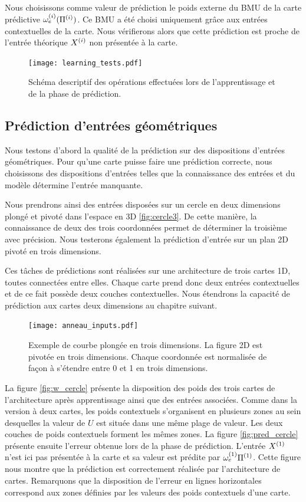 \documentclass[../main]{subfiles}
\begin{document}
Nous choisissons comme valeur de prédiction le poids externe du BMU de la carte prédictive $\omega_{e}^{({i})}(\Pi^{({i})})$. Ce BMU a été choisi uniquement grâce aux entrées contextuelles de la carte. Nous vérifierons alors que cette prédiction est proche de l'entrée théorique $X^{({i})}$ non présentée à la carte.

\begin{figure}
	\texttt{[image: learning\_tests.pdf]}
	\caption{Schéma descriptif des opérations effectuées lors de l'apprentissage et de la phase de prédiction.\label{fig:schema_pred}}
\end{figure}

\subsection{Prédiction d'entrées géométriques}

Nous testons d'abord la qualité de la prédiction sur des dispositions d'entrées géométriques.
Pour qu'une carte puisse faire une prédiction correcte, nous choisissons des dispositions d'entrées telles que la connaissance des entrées et du modèle détermine l'entrée manquante.

Nous prendrons ainsi des entrées disposées sur un cercle en deux dimensions plongé et pivoté dans l'espace en 3D \ref{fig:cercle3}. De cette manière, la connaissance de deux des trois coordonnées permet de déterminer la troisième avec précision. Nous testerons également la prédiction d'entrée sur un plan 2D pivoté en trois dimensions.

Ces tâches de prédictions sont réalisées sur une architecture de trois cartes 1D, toutes connectées entre elles. Chaque carte prend donc deux entrées contextuelles et de ce fait possède deux couches contextuelles.
Nous étendrons la capacité de prédiction aux cartes deux dimensions au chapitre suivant.

\begin{figure}
	\centering\texttt{[image: anneau\_inputs.pdf]}
	\caption{Exemple de courbe plongée en trois dimensions. La figure 2D est pivotée en trois dimensions. Chaque coordonnée est normalisée de façon à s'étendre entre 0 et 1 en trois dimensions.
	\label{fig:in_3D}}
\end{figure}

La figure \ref{fig:w_cercle} présente la disposition des poids des trois cartes de l'architecture après apprentissage ainsi que des entrées associées. 
Comme dans la version à deux cartes, les poids contextuels s'organisent en plusieurs zones au sein desquelles la valeur de $U$ est située dans une même plage de valeur.
Les deux couches de poids contextuels forment les mêmes zones.
La figure \ref{fig:pred_cercle} présente ensuite l'erreur obtenue lors de la phase de prédiction. L'entrée $X^{({1})}$ n'est ici pas présentée à la carte et sa valeur est prédite par $\omega_{e}^{({1})}{\Pi^{({1})}}$. 
Cette figure nous montre que la prédiction est correctement réalisée par l'architecture de cartes. Remarquons que la disposition de l'erreur en lignes horizontales correspond aux zones définies par les valeurs des poids contextuels d'une carte.
\end{document}

